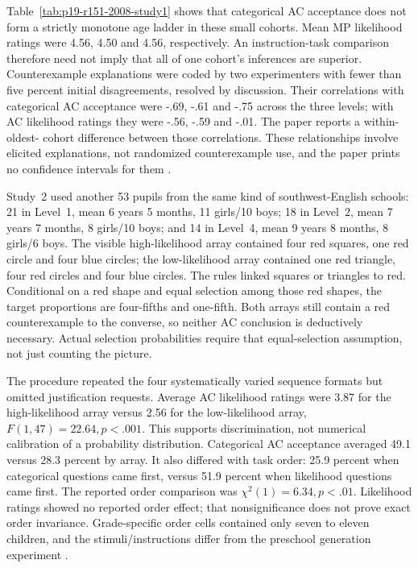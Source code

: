 Table~\ref{tab:p19-r151-2008-study1} shows that categorical AC acceptance
does not form a strictly monotone age ladder in these small cohorts.
Mean MP likelihood ratings were 4.56, 4.50 and 4.56, respectively.
An instruction-task comparison therefore need not imply that all of one
cohort's inferences are superior. Counterexample explanations were coded
by two experimenters with fewer than five percent initial disagreements,
resolved by discussion. Their correlations with categorical AC acceptance
were -.69, -.61 and -.75 across the three levels; with AC likelihood
ratings they were -.56, -.59 and -.01. The paper reports a within-oldest-
cohort difference between those correlations. These relationships involve
elicited explanations, not randomized counterexample use, and the paper
prints no confidence intervals for them
\cite[pp.~1071--1073, tables~1--3]{MarkovitsThompson2008Development}.

Study~2 used another 53 pupils from the same kind of southwest-English
schools: 21 in Level~1, mean 6 years 5 months, 11 girls/10 boys;
18 in Level~2, mean 7 years 7 months, 8 girls/10 boys; and 14 in
Level~4, mean 9 years 8 months, 8 girls/6 boys. The visible high-likelihood
array contained four red squares, one red circle and four blue circles;
the low-likelihood array contained one red triangle, four red circles and
four blue circles. The rules linked squares or triangles to red.
Conditional on a red shape and equal selection among those red shapes,
the target proportions are four-fifths and one-fifth. Both arrays still
contain a red counterexample to the converse, so neither AC conclusion
is deductively necessary. Actual selection probabilities require that
equal-selection assumption, not just counting the picture.

The procedure repeated the four systematically varied sequence formats
but omitted justification requests. Average AC likelihood ratings were
3.87 for the high-likelihood array versus 2.56 for the low-likelihood
array, \(F(1,47)=22.64,p<.001\). This supports discrimination, not
numerical calibration of a probability distribution. Categorical AC
acceptance averaged 49.1 versus 28.3 percent by array. It also differed
with task order: 25.9 percent when categorical questions came first,
versus 51.9 percent when likelihood questions came first. The reported
order comparison was \(\chi^2(1)=6.34,p<.01\). Likelihood ratings
showed no reported order effect; that nonsignificance does not prove exact
order invariance. Grade-specific order cells contained only seven to
eleven children, and the stimuli/instructions differ from the preschool
generation experiment
\cite[pp.~1073--1075, table~4]{MarkovitsThompson2008Development}.

